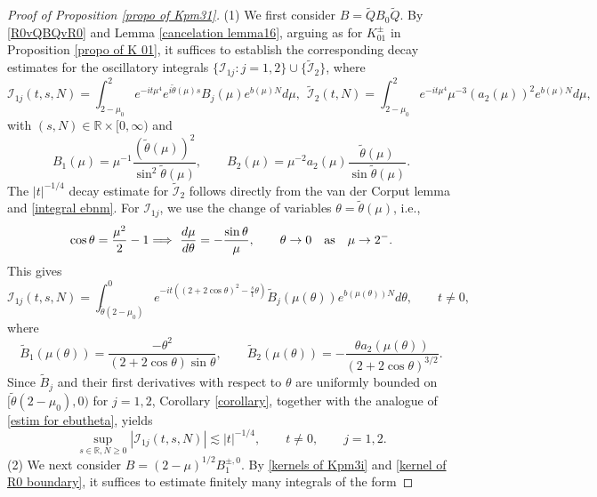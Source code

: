 \documentclass[reqno, 11pt]{amsart}
\newcommand\R{\mathbb{R}}
\newcommand\mcaI{\mathcal{I}}
\numberwithin{equation}{section}
\begin{document}
\begin{proof}[Proof of Proposition \ref{propo of Kpm31}]
(1) We first consider $B=\widetilde{Q}B_{0}\widetilde{Q}$. By \eqref{R0vQBQvR0} and Lemma \ref{cancelation lemma16}, arguing as for $K^{\pm}_{01}$ in Proposition \ref{propo of K 01}, it suffices to establish the corresponding decay estimates for the oscillatory integrals  $\{{\mcaI}_{1j}:j=1,2\}\cup\{\widetilde{\mcaI}_2\}$, where 
\begin{equation}\label{mcaIj mcaI2}
{\mcaI}_{1j}(t,s,N)=\int_{2-\mu_0}^{2}e^{-it\mu^4}e^{i\widetilde{\theta}(\mu)s}B_{j}(\mu)e^{b(\mu)N}d\mu,\ \ \widetilde{\mcaI}_{2}(t,N)=\int_{2-\mu_0}^{2}e^{-it\mu^4}\mu^{-3}(a_2(\mu))^2e^{b(\mu)N}d\mu,
\end{equation}
with $(s,N)\in\R\times[0,\infty)$ and 
\begin{equation}\label{Bj mu}
B_1(\mu)=\mu^{-1}\frac{(\tilde{\theta}(\mu))^2}{\sin^2\tilde{\theta}(\mu)},\qquad B_2(\mu)=\mu^{-2}a_2(\mu)\frac{\tilde{\theta}(\mu)}{\sin\tilde{\theta}(\mu)}.
\end{equation}
The $|t|^{-1/4}$ decay estimate for $\widetilde{\mcaI}_2$   follows directly from the van der Corput lemma and \eqref{integral ebnm}.
For ${\mcaI}_{1j}$,  we use the change of variables $\theta=\tilde{\theta}(\mu)$, i.e.,
\begin{equation}\label{varible substi2}
\cos{\theta}=\frac{\mu^2}{2}-1 \Longrightarrow\  \frac{d\mu}{d\theta}=-\frac{\sin\theta}{\mu},\qquad {\theta}\rightarrow0\quad {\rm as}\quad  \mu\rightarrow2^-.
\end{equation}
This gives
\begin{equation*}
{\mcaI}_{1j}(t,s,N)=\int_{\tilde\theta(2-\mu_0)}^{0}e^{-it((2+2\cos\theta)^2-\frac{s}{t}\theta)}\widetilde{B}_j(\mu(\theta))e^{b(\mu(\theta))N}d\theta,\qquad t\neq0,
 \end{equation*}
where 
$$\widetilde{B}_1(\mu(\theta))=\frac{-{\theta}^2}{(2+2\cos{\theta})\sin\theta},\qquad \widetilde{B}_2(\mu(\theta))=-\frac{\theta a_2(\mu(\theta))}{(2+2\cos{\theta})^{3/2}}.$$
Since $\widetilde B_j$ and their first derivatives with respect to $\theta$ are uniformly bounded on
$[\tilde\theta(2-\mu_0),0)$ for $j=1,2$, Corollary \ref{corollary}, together with the analogue of \eqref{estim for ebutheta}, yields
\begin{equation}\label{estim of mcaI1j}
\sup_{s\in\R,N\ge0}
|{\mcaI}_{1j}(t,s,N)|
\lesssim |t|^{-1/4},\qquad t\neq0,
\qquad j=1,2.
\end{equation}
\vskip0.1cm
(2) We next consider $B=(2-\mu)^{1/2}B^{\pm,0}_{1}$. By \eqref{kernels of Kpm3i} and \eqref{kernel of R0 boundary}, it suffices to estimate finitely many integrals of the form 

\end{proof}
\end{document}
